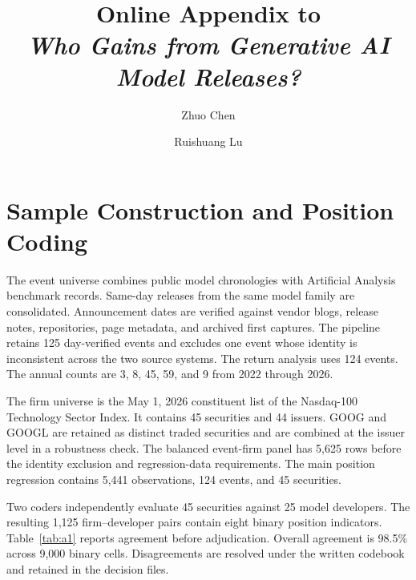 \documentclass[12pt]{article}
\title{Online Appendix to\\
\textit{Who Gains from Generative AI Model Releases?}}
\author{Zhuo Chen \and Ruishuang Lu}
\date{}
\begin{document}
\maketitle

\section{Sample Construction and Position Coding}

The event universe combines public model chronologies with Artificial
Analysis benchmark records. Same-day releases from the same model family
are consolidated. Announcement dates are verified against vendor blogs,
release notes, repositories, page metadata, and archived first captures.
The pipeline retains 125 day-verified events and excludes one event whose
identity is inconsistent across the two source systems. The return analysis
uses 124 events. The annual counts are 3, 8, 45, 59, and 9 from 2022 through
2026.

The firm universe is the May 1, 2026 constituent list of the Nasdaq-100
Technology Sector Index. It contains 45 securities and 44 issuers. GOOG and
GOOGL are retained as distinct traded securities and are combined at the
issuer level in a robustness check. The balanced event-firm panel has 5,625
rows before the identity exclusion and regression-data requirements. The
main position regression contains 5,441 observations, 124 events, and 45
securities.

Two coders independently evaluate 45 securities against 25 model
developers. The resulting 1,125 firm--developer pairs contain eight binary
position indicators. Table~\ref{tab:a1} reports agreement before
adjudication. Overall agreement is 98.5\% across 9,000 binary cells.
Disagreements are resolved under the written codebook and retained in the
decision files.
\end{document}
